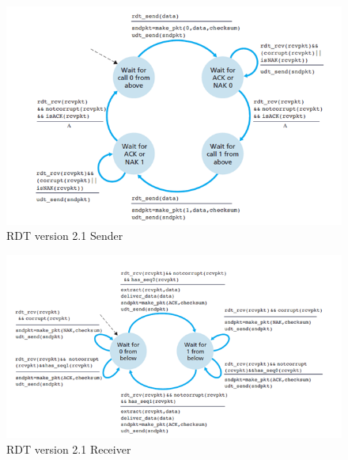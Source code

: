 \documentclass{article}
\theoremstyle{plain}
\theoremstyle{definition}
\begin{document}
\begin{figure}[!h]
    \centering
    \includegraphics[scale=0.8]{rdt21s.png}
    \caption{RDT version 2.1 Sender}
    \label{fig:my_label_5}
\end{figure}

\begin{figure}[!h]
    \centering
    \includegraphics[scale=0.8]{rdt21r.png}
    \caption{RDT version 2.1 Receiver}
    \label{fig:my_label_6}
\end{figure}
\end{document}
